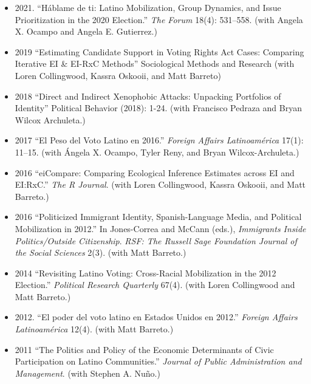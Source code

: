 \documentclass[11pt,letterpaper]{moderncv}
\begin{document}
\begin{itemize}
\item 2021. ``Háblame de ti: Latino Mobilization, Group Dynamics, and Issue Prioritization in the 2020 Election.'' \textit{The Forum} 18(4): 531--558. (with Angela X. Ocampo and Angela E. Gutierrez.) \\

\item 2019 ``Estimating Candidate Support in Voting Rights Act Cases: Comparing Iterative EI \& EI-RxC Methods'' Sociological Methods and Research  (with Loren Collingwood, Kassra Oskooii, and Matt Barreto)   \\

\item 2018 ``Direct and Indirect Xenophobic Attacks: Unpacking Portfolios of Identity'' Political Behavior (2018): 1-24. (with Francisco Pedraza and Bryan Wilcox Archuleta.) \\


\item 2017 ``El Peso del Voto Latino en 2016.'' \textit{Foreign Affairs Latinoamérica} 17(1): 11--15. (with Ángela X. Ocampo, Tyler Reny, and Bryan Wilcox-Archuleta.) \\



\item 2016 ``eiCompare: Comparing Ecological Inference Estimates across EI and EI:RxC.'' \textit{The R Journal}. (with Loren Collingwood, Kassra Oskooii, and Matt Barreto.) \\


\item 2016 ``Politicized Immigrant Identity, Spanish-Language Media, and Political Mobilization in 2012.'' In Jones-Correa and McCann (eds.), \textit{Immigrants Inside Politics/Outside Citizenship}. \textit{RSF: The Russell Sage Foundation Journal of the Social Sciences} 2(3). (with Matt Barreto.) \\

\item 2014 ``Revisiting Latino Voting: Cross-Racial Mobilization in the 2012 Election.'' \textit{Political Research Quarterly} 67(4). (with Loren Collingwood and Matt Barreto.) \\

\item 2012. ``El poder del voto latino en Estados Unidos en 2012.'' \textit{Foreign Affairs Latinoamérica} 12(4). (with Matt Barreto.) \\

\item 2011 ``The Politics and Policy of the Economic Determinants of Civic Participation on Latino Communities.'' \textit{Journal of Public Administration and Management}. (with Stephen A. Nuño.) \\


\end{itemize}
\end{document}
